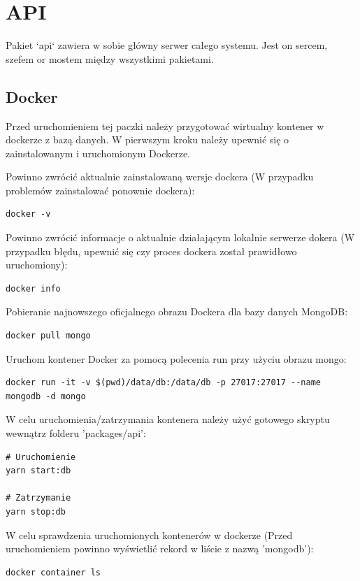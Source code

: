 \section{API}
Pakiet `api` zawiera w sobie główny serwer całego systemu. Jest on sercem, szefem or mostem między wszystkimi pakietami.

\subsection{Docker}
Przed uruchomieniem tej paczki należy przygotować wirtualny kontener w dockerze z bazą danych. W pierwszym kroku należy upewnić się o zainstalowanym i uruchomionym Dockerze.

Powinno zwrócić aktualnie zainstalowaną wersje dockera (W przypadku problemów zainstalować ponownie dockera):
\begin{lstlisting}
docker -v
\end{lstlisting}

Powinno zwrócić informacje o aktualnie działającym lokalnie serwerze dokera (W przypadku błędu, upewnić się czy proces dockera został prawidłowo uruchomiony):
\begin{lstlisting}
docker info
\end{lstlisting}

Pobieranie najnowszego oficjalnego obrazu Dockera dla bazy danych MongoDB:

\begin{lstlisting}
docker pull mongo
\end{lstlisting}

Uruchom kontener Docker za pomocą polecenia run przy użyciu obrazu mongo:

\begin{lstlisting}[breaklines=true]
docker run -it -v $(pwd)/data/db:/data/db -p 27017:27017 --name mongodb -d mongo
\end{lstlisting}

W celu uruchomienia/zatrzymania kontenera należy użyć gotowego skryptu wewnątrz folderu 'packages/api':

\begin{lstlisting}
# Uruchomienie
yarn start:db

# Zatrzymanie
yarn stop:db
\end{lstlisting}

W celu sprawdzenia uruchomionych kontenerów w dockerze (Przed uruchomieniem powinno wyświetlić rekord w liście z nazwą 'mongodb'):

\begin{lstlisting}
docker container ls
\end{lstlisting}

